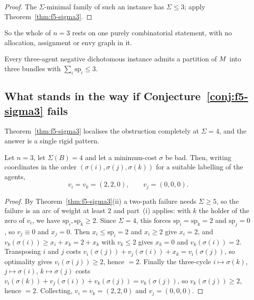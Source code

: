 \begin{proof}
The $\Sigma$-minimal family of such an instance has $\Sigma \le 3$; apply
Theorem~\ref{thm:f5-sigma3}.
\end{proof}

So the whole of $n = 3$ rests on one purely combinatorial statement, with no
allocation, assignment or envy graph in it.

\begin{conjecture}
\label{conj:f5-sigma3}
Every three-agent negative dichotomous instance admits a partition of $M$
into three bundles with $\sum_i \mathrm{sp}_i \le 3$.
\end{conjecture}

\subsection{What stands in the way if Conjecture~\ref{conj:f5-sigma3} fails}
\label{sec:f5-pattern}

Theorem~\ref{thm:f5-sigma3} localises the obstruction completely at
$\Sigma = 4$, and the answer is a single rigid pattern.

\begin{proposition}[The unique obstruction at $\Sigma = 4$]
\label{prop:f5-pattern}
Let $n = 3$, let $\Sigma(B) = 4$ and let a minimum-cost $\sigma$ be bad. Then,
writing coordinates in the order $(\sigma(i),\sigma(j),\sigma(k))$ for a suitable
labelling of the agents,
\[
  v_i = v_k = (2,2,0), \qquad v_j = (0,0,0).
\]
\end{proposition}

\begin{proof}
By Theorem~\ref{thm:f5-sigma3}(ii) a two-path failure needs $\Sigma \ge 5$, so
the failure is an arc of weight at least $2$ and part~(i) applies: with $k$ the
holder of the zero of $v_i$, we have $\mathrm{sp}_i, \mathrm{sp}_k \ge 2$. Since
$\Sigma = 4$, this forces $\mathrm{sp}_i = \mathrm{sp}_k = 2$ and
$\mathrm{sp}_j = 0$, so $v_j \equiv 0$ and $x_j = 0$. Then $x_i \le
\mathrm{sp}_i = 2$ and $x_i \ge 2$ give $x_i = 2$, and
$v_k(\sigma(i)) \ge x_i + x_k = 2 + x_k$ with $v_k \le 2$ gives $x_k = 0$ and
$v_k(\sigma(i)) = 2$. Transposing $i$ and $j$ costs
$v_i(\sigma(j)) + v_j(\sigma(i)) + x_k = v_i(\sigma(j))$, so optimality gives
$v_i(\sigma(j)) \ge 2$, hence $= 2$. Finally the three-cycle
$i \mapsto \sigma(k)$, $j \mapsto \sigma(i)$, $k \mapsto \sigma(j)$ costs
$v_i(\sigma(k)) + v_j(\sigma(i)) + v_k(\sigma(j)) = v_k(\sigma(j))$, so
$v_k(\sigma(j)) \ge 2$, hence $= 2$. Collecting, $v_i = v_k = (2,2,0)$ and
$v_j = (0,0,0)$.
\end{proof}

